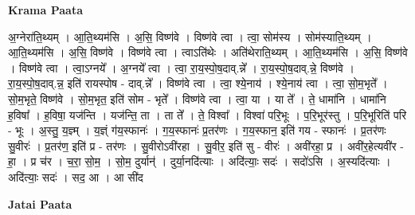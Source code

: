 \documentclass[17pt]{extarticle}
\begin{document}
\textbf{Krama Paata} \newline

अ॒ग्नेरा॑ति॒थ्यम् । आ॒ति॒थ्यम॑सि । अ॒सि॒ विष्ण॑वे । विष्ण॑वे त्वा । त्वा॒ सोम॑स्य । सोम॑स्याति॒थ्यम् । आ॒ति॒थ्यम॑सि । अ॒सि॒ विष्ण॑वे । विष्ण॑वे त्वा । त्वाऽति॑थेः । अति॑थेराति॒थ्यम् । आ॒ति॒थ्यम॑सि । अ॒सि॒ विष्ण॑वे । विष्ण॑वे त्वा । त्वा॒ऽग्नये᳚ । अ॒ग्नये᳚ त्वा । त्वा॒ रा॒य॒स्पो॒ष॒दाव्.न्ने᳚ । रा॒य॒स्पो॒ष॒दाव्.न्ने॒ विष्ण॑वे । रा॒य॒स्पो॒ष॒दाव्.न्न॒ इति॑ रायस्पोष - दाव्.न्ने᳚ । विष्ण॑वे त्वा । त्वा॒ श्ये॒नाय॑ । श्ये॒नाय॑ त्वा । त्वा॒ सो॒म॒भृते᳚ । सो॒म॒भृते॒ विष्ण॑वे । सो॒म॒भृत॒ इति॑ सोम - भृते᳚ । विष्ण॑वे त्वा । त्वा॒ या । या ते᳚ । ते॒ धामा॑नि । धामा॑नि ह॒विषा᳚ । ह॒विषा॒ यज॑न्ति । यज॑न्ति॒ ता । ता ते᳚ । ते॒ विश्वा᳚ । विश्वा॑ परि॒भूः । प॒रि॒भूर॑स्तु । प॒रि॒भूरिति॑ परि - भूः । अ॒स्तु॒ य॒ज्ञ्म् । य॒ज्ञ्ं ग॑य॒स्फानः॑ । ग॒य॒स्फानः॑ प्र॒तर॑णः । ग॒य॒स्फान॒ इति॑ गय - स्फानः॑ । प्र॒तर॑णः सु॒वीरः॑ । प्र॒तर॑ण॒ इति॑ प्र - तर॑णः । सु॒वीरोऽवी॑रहा । सु॒वीर॒ इति॑ सु - वीरः॑ । अवी॑रहा॒ प्र । अवी॑र॒हेत्यवी॑र - हा॒ । प्र च॑र । च॒रा॒ सो॒म॒ । सो॒म॒ दुर्यान्॑ । दुर्या॒नदि॑त्याः । अदि॑त्याः॒ सदः॑ । सदो॑ऽसि । अ॒स्यदि॑त्याः । अदि॑त्याः॒ सदः॑ । सद॒ आ । आ सी॑द \newline

\textbf{Jatai Paata} \newline
\end{document}
